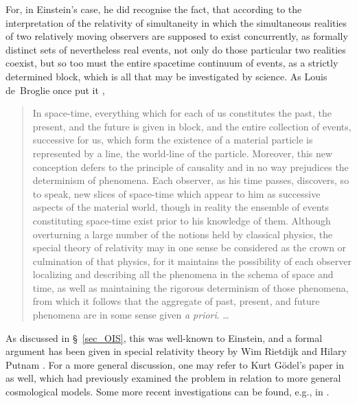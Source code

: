 For, in Einstein's case, he did recognise the fact, that according to the interpretation of the relativity of simultaneity in which the simultaneous realities of two relatively moving observers are supposed to exist concurrently, as formally distinct sets of nevertheless real events, not only do those particular two realities coexist, but so too must the entire spacetime continuum of events, as a strictly determined block, which is all that may be investigated by science. As Louis de~Broglie once put it \cite{Einstein1951},
\begin{quotation}
In space-time, everything which for each of us constitutes the past, the present, and the future is given in block, and the entire collection of events, successive for us, which form the existence of a material particle is represented by a line, the world-line of the particle. Moreover, this new conception defers to the principle of causality and in no way prejudices the determinism of phenomena. Each observer, as his time passes, discovers, so to speak, new slices of space-time which appear to him as successive aspects of the material world, though in reality the ensemble of events constituting space-time exist prior to his knowledge of them. Although overturning a large number of the notions held by classical physics, the special theory of relativity may in one sense be considered as the crown or culmination of that physics, for it maintains the possibility of each observer localizing and describing all the phenomena in the schema of space and time, as well as maintaining the rigorous determinism of those phenomena, from which it follows that the aggregate of past, present, and future phenomena are in some sense given \textit{a priori}. \ldots
\end{quotation}
As discussed in \S~\ref{sec_OIS}, this was well-known to Einstein, and a formal argument has been given in special relativity theory by Wim Rietdijk \cite{Rietdijk1966} and Hilary Putnam \cite{Putnam1967}. For a more general discussion, one may refer to Kurt G\"{o}del's paper in \cite{Einstein1951} as well, which had previously examined the problem in relation to more general cosmological models. Some more recent investigations can be found, e.g., in \cite{Petkov2007}.

